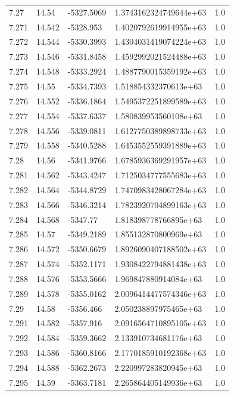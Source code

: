 \begin{tabular}{lllll}
7.27 & 14.54 & -5327.5069 & 1.3743162324749644e+63 & 1.0 \\
7.271 & 14.542 & -5328.953 & 1.4020792619914955e+63 & 1.0 \\
7.272 & 14.544 & -5330.3993 & 1.4304031419074224e+63 & 1.0 \\
7.273 & 14.546 & -5331.8458 & 1.4592992021524488e+63 & 1.0 \\
7.274 & 14.548 & -5333.2924 & 1.4887790015359192e+63 & 1.0 \\
7.275 & 14.55 & -5334.7393 & 1.518854332370613e+63 & 1.0 \\
7.276 & 14.552 & -5336.1864 & 1.5495372251899589e+63 & 1.0 \\
7.277 & 14.554 & -5337.6337 & 1.580839953560108e+63 & 1.0 \\
7.278 & 14.556 & -5339.0811 & 1.6127750389898733e+63 & 1.0 \\
7.279 & 14.558 & -5340.5288 & 1.6453552559391889e+63 & 1.0 \\
7.28 & 14.56 & -5341.9766 & 1.6785936369291957e+63 & 1.0 \\
7.281 & 14.562 & -5343.4247 & 1.7125034777555683e+63 & 1.0 \\
7.282 & 14.564 & -5344.8729 & 1.7470983428067284e+63 & 1.0 \\
7.283 & 14.566 & -5346.3214 & 1.7823920704899163e+63 & 1.0 \\
7.284 & 14.568 & -5347.77 & 1.818398778766895e+63 & 1.0 \\
7.285 & 14.57 & -5349.2189 & 1.855132870800969e+63 & 1.0 \\
7.286 & 14.572 & -5350.6679 & 1.8926090407188502e+63 & 1.0 \\
7.287 & 14.574 & -5352.1171 & 1.9308422794881438e+63 & 1.0 \\
7.288 & 14.576 & -5353.5666 & 1.969847880914084e+63 & 1.0 \\
7.289 & 14.578 & -5355.0162 & 2.0096414477574346e+63 & 1.0 \\
7.29 & 14.58 & -5356.466 & 2.050238897975465e+63 & 1.0 \\
7.291 & 14.582 & -5357.916 & 2.0916564710895105e+63 & 1.0 \\
7.292 & 14.584 & -5359.3662 & 2.133910734681176e+63 & 1.0 \\
7.293 & 14.586 & -5360.8166 & 2.1770185910192368e+63 & 1.0 \\
7.294 & 14.588 & -5362.2673 & 2.220997283820945e+63 & 1.0 \\
7.295 & 14.59 & -5363.7181 & 2.265864405149936e+63 & 1.0 \\

\end{tabular}
